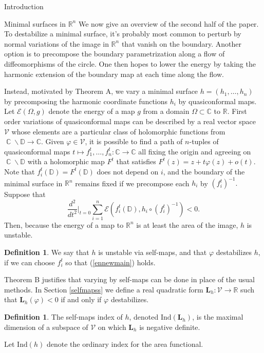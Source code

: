 \documentclass[10pt]{amsart}
\newcommand{\R}{\mathbb R}
\DeclareMathOperator{\C}{\mathbb{C}}
\theoremstyle{definition}
\newtheorem{defn}[thm]{Definition}
\begin{document}
\begin{section}{Introduction}
\begin{subsection}{Minimal surfaces in $\R^n$}
We now give an overview of the second half of the paper. To destabilize a minimal surface, it's probably most common to perturb by normal variations of the image in $\R^n$ that vanish on the boundary. Another option is to precompose the boundary parametrization along a flow of diffeomorphisms of the circle. One then hopes to lower the energy by taking the harmonic extension of the boundary map at each time along the flow.

 Instead, motivated by Theorem A, we vary a minimal surface $h=(h_1,\dots,h_n)$ by precomposing the harmonic coordinate functions $h_i$ by quasiconformal maps. Let $\mathcal{E}(\Omega,g)$ denote the energy of a map $g$ from a domain $\Omega\subset \mathbb{C}$ to $\mathbb{R}$. First order variations of quasiconformal maps can be described by a real vector space $\mathcal{V}$ whose elements are a particular class of holomorphic functions from $\C\backslash \mathbb{D}\to \mathbb{C}$. Given $\varphi\in\mathcal{V}$, it is possible to find a path of $n$-tuples of quasiconformal maps $t\mapsto f_1^t,\dots, f_n^t:\mathbb{C}\to\mathbb{C}$ all fixing the origin and agreeing on $\C\backslash\mathbb{D}$ with a holomorphic map $F^t$ that satisfies $F^t(z)=z+t\varphi(z)+o(t)$. Note that $f_i^t(\mathbb{D})=F^t(\mathbb{D})$ does not depend on $i$, and the boundary of the minimal surface in $\mathbb{R}^n$ remains fixed if we precompose each $h_i$ by $(f_i^t)^{-1}.$ Suppose that 
\begin{equation}\label{ennewmain}
    \frac{d^2}{dt^2}|_{t=0}\sum_{i=1}^n\mathcal{E}(f_i^t(\mathbb{D}),h_i\circ (f_i^t)^{-1})<0.
\end{equation}
Then, because the energy of a map to $\R^n$ is at least the area of the image, $h$ is unstable. 
\begin{defn}
We say that $h$ is unstable via self-maps, and that $\varphi$ destabilizes $h$, if we can choose $f_i^t$ so that (\ref{ennewmain}) holds.
\end{defn}
Theorem B justifies that varying by self-maps can be done in place of the usual methods. In Section \ref{selfmapss} we define a real quadratic form $\mathbf{L}_h: \mathcal{V}\to \R$ such that $\mathbf{L}_h(\varphi)<0$ if and only if $\varphi$ destabilizes.
\begin{defn}
The self-maps index of $h$, denoted $\textrm{Ind}(\mathbf{L}_h)$, is the maximal dimension of a subspace of $\mathcal{V}$ on which $\mathbf{L}_h$ is negative definite.
\end{defn}
Let $\textrm{Ind}(h)$ denote the ordinary index for the area functional.

\end{subsection}
\end{section}
\end{document}
